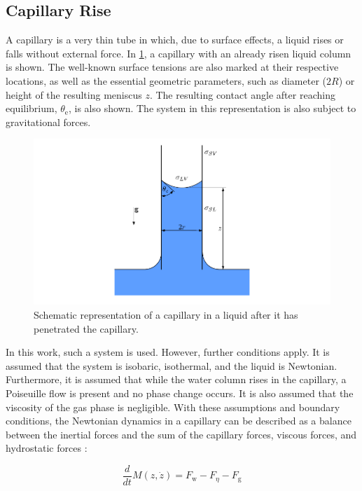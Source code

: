 \subsection{Capillary Rise}
A capillary is a very thin tube in which, due to surface effects, a liquid rises or falls without external force. In \ref{fig: classicCapillary}, a capillary with an already risen liquid column is shown. The well-known surface tensions are also marked at their respective locations, as well as the essential geometric parameters, such as diameter ($2R$) or height of the resulting meniscus $z$. The resulting contact angle after reaching equilibrium, $\theta_{\mathrm{e}}$, is also shown. The system in this representation is also subject to gravitational forces.

\begin{figure}[h]
    \centering
    \includegraphics[width=.95\textwidth]{Pictures/classicCapillary.pdf}
    \caption{Schematic representation of a capillary in a liquid after it has penetrated the capillary.}
    \label{fig: classicCapillary}
\end{figure}

In this work, such a system is used. However, further conditions apply. It is assumed that the system is isobaric, isothermal, and the liquid is Newtonian. Furthermore, it is assumed that while the water column rises in the capillary, a Poiseuille flow is present and no phase change occurs. It is also assumed that the viscosity of the gas phase is negligible. With these assumptions and boundary conditions, the Newtonian dynamics in a capillary can be described as a balance between the inertial forces and the sum of the capillary forces, viscous forces, and hydrostatic forces \cite{fricke2023AnalyticalStudyCapillary}:

\begin{equation}
\label{eq: NewtonBalanceForcesOnly}
    \frac{d}{dt}M(z,\dot{z}) = F_{\mathrm{w}} - F_{\eta} - F_{\mathrm{g}}
\end{equation}

